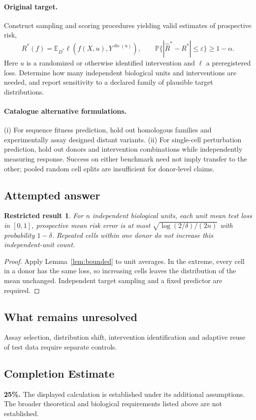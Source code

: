 \documentclass[11pt]{article}
\newcommand{\E}{\mathbb E}
\newcommand{\Prob}{\mathbb P}
\providecommand{\E}{\mathbb E}
\providecommand{\Prob}{\mathbb P}
\newtheorem{attemptresult}{Restricted result}[section]
\begin{document}
\paragraph{Original target.}
Construct sampling and scoring procedures yielding valid estimates of prospective risk,
\[R^*(f)=\E_{D^*}\ell(f(X,u),Y^{\operatorname{do}(u)}),\qquad \Prob\{|\widehat R^*-R^*|\le\varepsilon\}\ge1-\alpha.\]
Here $u$ is a randomized or otherwise identified intervention and $\ell$ a preregistered loss. Determine how many independent biological units and interventions are needed, and report sensitivity to a declared family of plausible target distributions.
\paragraph{Catalogue alternative formulations.}
(i) For sequence fitness prediction, hold out homologous families and experimentally assay designed distant variants. (ii) For single-cell perturbation prediction, hold out donors and intervention combinations while independently measuring response. Success on either benchmark need not imply transfer to the other; pooled random cell splits are insufficient for donor-level claims.
\subsection{Attempted answer}
\begin{attemptresult}
For $n$ independent biological units, each unit mean test loss in $[0,1]$, prospective mean risk error is at most $\sqrt{\log(2/\delta)/(2n)}$ with probability $1-\delta$. Repeated cells within one donor do not increase this independent-unit count.
\end{attemptresult}
\begin{proof}
Apply Lemma~\ref{lem:bounded} to unit averages. In the extreme, every cell in a donor has the same loss, so increasing cells leaves the distribution of the mean unchanged. Independent target sampling and a fixed predictor are required.
\end{proof}
\subsection{What remains unresolved}
Assay selection, distribution shift, intervention identification and adaptive reuse of test data require separate controls.
\subsection{Completion Estimate}
\textbf{25\%.} The displayed calculation is established under its additional assumptions. The broader theoretical and biological requirements listed above are not established.
\end{document}
